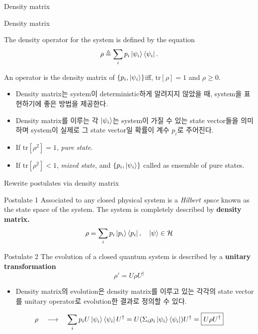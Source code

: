 \documentclass[9pt]{beamer}
\begin{document}
    \begin{section}{Density matrix}
        \begin{frame}{Density matrix}
            \begin{definition}
                The density operator for the system is defined by the equation
                $$\rho \triangleq \sum_{i} p_i \ket{\psi_i} \bra{\psi_i}.$$
            \end{definition}
            \begin{theorem}
                An operator is the density matrix of $\{p_i, \ket{\psi_i}\}$iff,
                $\text{tr}[\rho]=1$ and   $\rho \ge 0$.
            \end{theorem}
            \begin{itemize}
                \item Density matrix는 system이 deterministic하게 알려지지 않았을 때, system을 표현하기에 좋은 방법을 제공한다.
                \item Density matrix를 이루는 각 $\ket{\psi_i}$는 system이 가질 수 있는 state vector들을 의미하며 system이 실제로 그 state vector일 확률이 계수 $p_i$로 주어진다.
                \item If $\text{tr}[\rho^2]=1$, \textit{pure state}.
                \item If $\text{tr}[\rho^2]<1$, \textit{mixed state}, and $\{p_i, \ket{\psi_i}\}$ called as ensemble of pure states.
            \end{itemize}

        \end{frame}

        \begin{frame}{Rewrite postulates via density matrix}
            \begin{block}{Postulate 1}
                Associated to any closed physical system is a \textit{Hilbert space} known as the state space of the system. The system is completely described by \textbf{density matrix.}
                $$ \rho = \sum_i p_i \ket{p_i} \bra{p_i}, \quad \ket \psi \in \mathcal H$$
            \end{block}

            \begin{block}{Postulate 2}
                The evolution of a closed quantum system is described by a \textbf{unitary transformation}
                $$ \rho' = U \rho U^\dagger$$
            \end{block}
            \begin{itemize}
                \item Density matrix의 evolution은 density matrix를 이루고 있는 각각의 state vector를 unitary operator로 evolution한 결과로 정의할 수 있다.
            \end{itemize}
            $$ \rho  \quad \longrightarrow\quad \sum_i p_i U \ket{\psi_i} \bra{\psi_i} U^\dagger = U(\Sigma_i \rho_i\ket{\psi_i} \bra{\psi_i}) U^\dagger= \boxed{U\rho 
            U^\dagger}  $$
        \end{frame}


\end{section}
\end{document}

